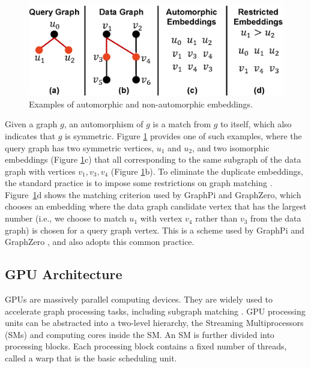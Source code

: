 \begin{figure}[t!]
\centering
\includegraphics[width=\columnwidth]{./figure/automorphism.eps}
\caption{Examples of automorphic and non-automorphic embeddings.}	
\label{fig:automo}
\end{figure}

 Given a graph $g$, an automorphism of $g$ is a match from $g$ to itself, which also indicates that $g$ is symmetric. Figure \ref{fig:automo} provides one of such examples, where the query graph has two symmetric vertices, $u_1$ and $u_2$, and two isomorphic embeddings (Figure \ref{fig:automo}c) that all corresponding to the same subgraph of the data graph with vertices $v_1, v_3, v_4$ (Figure \ref{fig:automo}b). To eliminate the duplicate embeddings, the standard practice is to impose some
restrictions on graph matching \cite{ mawhirter2019graphzero, shi2020graphpi}. Figure~\ref{fig:automo}d shows the matching criterion used
by GraphPi and GraphZero, which chooses an embedding where the data graph candidate vertex that has the largest number (i.e., we choose to
match $u_1$ with vertex $v_4$ rather than $v_3$ from the data graph) is chosen for a query graph vertex. This is a scheme used by GraphPi
\cite{shi2020graphpi} and GraphZero \cite{mawhirter2019graphzero}, and \SystemName also adopts this common practice.

\subsection{GPU Architecture}
GPUs are massively parallel computing devices. They are widely used to accelerate graph processing tasks, including subgraph matching
\cite{zeng2020gsi,guo2020exploiting,guo2020gpu}. GPU processing units can be abstracted into a two-level hierarchy, the Streaming
Multiprocessors (SMs) and computing cores inside the SM. An SM is further divided into processing blocks. Each processing block contains a
fixed number of threads, called a warp that is the basic scheduling unit.

